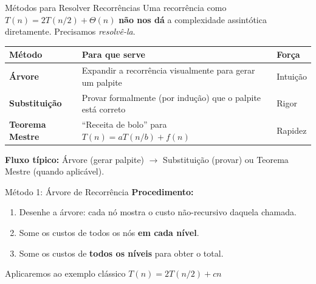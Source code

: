 \documentclass[aspectratio=169]{beamer}
\begin{document}
\begin{frame}[shrink]{Métodos para Resolver Recorrências}
    Uma recorrência como $T(n) = 2T(n/2) + \Theta(n)$ \textbf{não nos dá} a complexidade assintótica diretamente. Precisamos \emph{resolvê-la}.

    \vspace{0.3cm}
    \begin{center}
    \renewcommand{\arraystretch}{1.3}
    \begin{tabular}{>{\bfseries}l p{7cm} l}
        \toprule
        Método & Para que serve & Força \\
        \midrule
        Árvore & Expandir a recorrência visualmente para gerar um palpite & Intuição \\
        Substituição & Provar formalmente (por indução) que o palpite está correto & Rigor \\
        Teorema Mestre & ``Receita de bolo'' para $T(n) = aT(n/b) + f(n)$ & Rapidez \\
        \bottomrule
    \end{tabular}
    \end{center}
    
    \vspace{0.3cm}
    \textbf{Fluxo típico:} Árvore (gerar palpite) $\to$ Substituição (provar) ou Teorema Mestre (quando aplicável).
\end{frame}

\begin{frame}{Método 1: Árvore de Recorrência}
    \textbf{Procedimento:}
    \begin{enumerate}
        \item Desenhe a árvore: cada nó mostra o custo não-recursivo daquela chamada.
        \item Some os custos de todos os nós \textbf{em cada nível}.
        \item Some os custos de \textbf{todos os níveis} para obter o total.
    \end{enumerate}
    
    \vspace{0.4cm}
    \begin{block}{Aplicaremos ao exemplo clássico}
        $T(n) = 2T(n/2) + cn$
    \end{block}
\end{frame}
\end{document}

